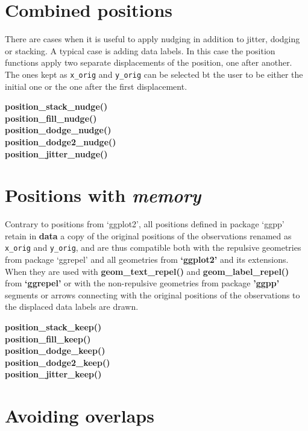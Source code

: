 \documentclass[DIV=25,a3,landscape,9pt]{scrartcl}\usepackage[]{graphicx}\usepackage[]{xcolor}
\begin{document}
\begin{multicols}{3}
\section*{Combined positions}

There are cases when it is useful to apply nudging in addition to jitter, dodging or stacking. A typical case is adding data labels. In this case the position functions apply two separate displacements of the position, one after another. The ones kept as \texttt{x\_orig} and \texttt{y\_orig} can be selected bt the user to be either the initial one or the one after the first displacement.\vspace{1ex}

\noindent
\textbf{position\_stack\_nudge()}\\
\textbf{position\_fill\_nudge()}\\
\textbf{position\_dodge\_nudge()}\\
\textbf{position\_dodge2\_nudge()}\\
\textbf{position\_jitter\_nudge()}\\

\section*{Positions with \textsl{memory}}

Contrary to positions from `ggplot2', all positions defined in package `ggpp' retain in \textbf{data} a copy of the original positions of the observations renamed as \texttt{x\_orig} and \texttt{y\_orig}, and are thus compatible both with the repulsive geometries from package `ggrepel' and all geometries from \textbf{`ggplot2'} and its extensions. When they are used with \textbf{geom\_text\_repel()} and \textbf{geom\_label\_repel()} from \textbf{`ggrepel'} or with the non-repulsive geometries from package \textbf{'ggpp'} segments or arrows connecting with the original positions of the observations to the displaced data labels are drawn.\vspace{1ex}

\noindent
\textbf{position\_stack\_keep()}\\
\textbf{position\_fill\_keep()}\\
\textbf{position\_dodge\_keep()}\\
\textbf{position\_dodge2\_keep()}\\
\textbf{position\_jitter\_keep()}\\

\section*{Avoiding overlaps}


\end{multicols}
\end{document}
